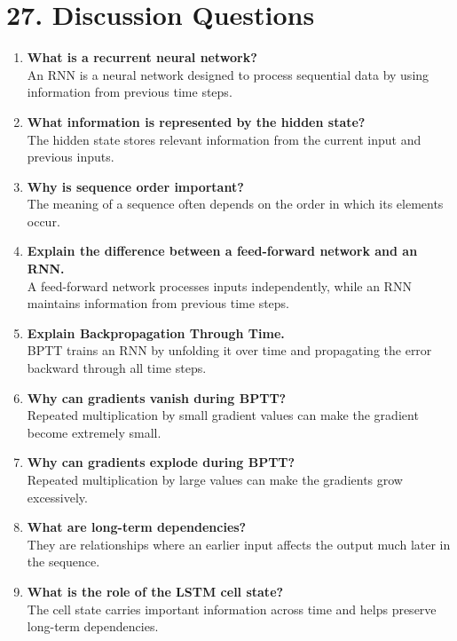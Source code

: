 \documentclass[10pt]{article}
\begin{document}
\section*{27. Discussion Questions}

\begin{enumerate}

\item \textbf{What is a recurrent neural network?}\\
An RNN is a neural network designed to process sequential data by using information from previous time steps.

\item \textbf{What information is represented by the hidden state?}\\
The hidden state stores relevant information from the current input and previous inputs.

\item \textbf{Why is sequence order important?}\\
The meaning of a sequence often depends on the order in which its elements occur.

\item \textbf{Explain the difference between a feed-forward network and an RNN.}\\
A feed-forward network processes inputs independently, while an RNN maintains information from previous time steps.

\item \textbf{Explain Backpropagation Through Time.}\\
BPTT trains an RNN by unfolding it over time and propagating the error backward through all time steps.

\item \textbf{Why can gradients vanish during BPTT?}\\
Repeated multiplication by small gradient values can make the gradient become extremely small.

\item \textbf{Why can gradients explode during BPTT?}\\
Repeated multiplication by large values can make the gradients grow excessively.

\item \textbf{What are long-term dependencies?}\\
They are relationships where an earlier input affects the output much later in the sequence.

\item \textbf{What is the role of the LSTM cell state?}\\
The cell state carries important information across time and helps preserve long-term dependencies.


\end{enumerate}
\end{document}
